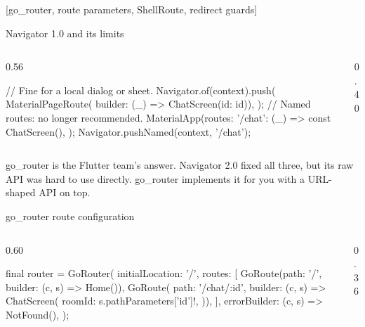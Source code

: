 \documentclass[10pt,aspectratio=169,t]{beamer}
\begin{document}
[go\_router, route parameters, ShellRoute, redirect guards]

\begin{frame}[fragile,eyebrow=Routing]{Navigator 1.0 and its limits}
  \begin{columns}[T]
    \begin{column}{0.56\textwidth}
\begin{dart}
// Fine for a local dialog or sheet.
Navigator.of(context).push(
  MaterialPageRoute(
      builder: (_) => ChatScreen(id: id)),
);
// Named routes: no longer recommended.
MaterialApp(routes: {
  '/chat': (_) => const ChatScreen(),
});
Navigator.pushNamed(context, '/chat');
\end{dart}
    \end{column}
    \begin{column}{0.40\textwidth}
    \end{column}
  \end{columns}
  \begin{takeaway}{go\_router is the Flutter team's answer.}
    Navigator 2.0 fixed all three, but its raw API was hard to use directly. go\_router implements it for you with a URL-shaped API on top.
  \end{takeaway}
\end{frame}

\begin{frame}[fragile,eyebrow=Routing]{go\_router route configuration}
  \begin{columns}[T]
    \begin{column}{0.60\textwidth}
\begin{dart}
final router = GoRouter(
  initialLocation: '/',
  routes: [
    GoRoute(path: '/',
        builder: (c, s) => Home()),
    GoRoute(
      path: '/chat/:id',
      builder: (c, s) => ChatScreen(
        roomId: s.pathParameters['id']!,
      )),
  ],
  errorBuilder: (c, s) => NotFound(),
);
\end{dart}
    \end{column}
    \begin{column}{0.36\textwidth}
    \end{column}
  \end{columns}
\end{frame}
\end{document}
